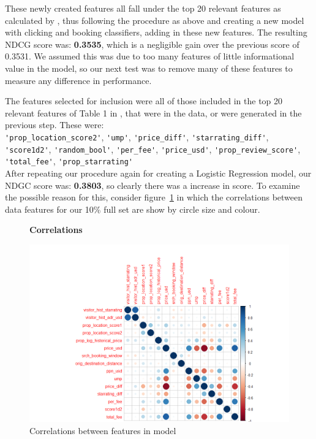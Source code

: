 \documentclass{llncs}
\begin{document}
These newly created features all fall under the top 20 relevant features as calculated by \cite{DBLP:journals/corr/LiuXZYPLSW13}, thus following the procedure as above and creating a new model with clicking and booking classifiers, adding in these new features. The resulting NDCG score was: \textbf{0.3535}, which is a negligible gain over the previous score of 0.3531. We assumed this was due to too many features of little informational value in the model, so our next test was to remove many of these features to measure any difference in performance.

 The features selected for inclusion were all of those included in the top 20 relevant features of Table 1 in \cite{DBLP:journals/corr/LiuXZYPLSW13}, that were in the data, or were generated in the previous step. These were:\\ \verb!'prop_location_score2'!, \verb!'ump'!, \verb!'price_diff'!, \verb!'starrating_diff'!, \verb!'score1d2'!, \verb!'random_bool'!, \verb!'per_fee'!, \verb!'price_usd'!, \verb!'prop_review_score'!, \verb!'total_fee'!, \verb!'prop_starrating'!
\\
After repeating our procedure again for creating a Logistic Regression model, our NDGC score was: \textbf{0.3803}, so clearly there was a increase in score. To examine the possible reason for this, consider figure~\ref{fig:corr} in which the correlations between data features for our 10\% full set are show by circle size and colour.

	\begin{figure}
	\centering
	\textbf{Correlations}\par\medskip
		\includegraphics[scale=0.3]{figures/corr_plot.png}
	\caption{Correlations between features in model}
	\label{fig:corr}
	\end{figure}
\end{document}
